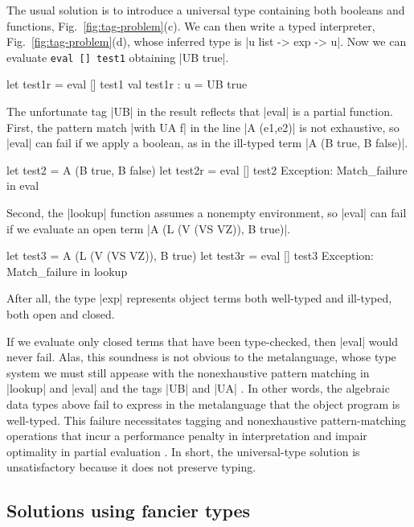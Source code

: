 The usual solution is to introduce a universal type \citep[\S1.3]
{WalidICFP02} containing both booleans and functions\ifshort,
Fig.~\ref{fig:tag-problem}(c)\fi.
\ifshort\else{}\fi
We can then write a typed interpreter\ifshort,
Fig.~\ref{fig:tag-problem}(d), \else{}\fi
whose inferred type is |u list -> exp -> u|. Now we can evaluate
\ifshort
\texttt{eval [] test1} obtaining |UB true|.
\else
\begin{code}
let test1r = eval [] test1
val test1r : u = UB true 
\end{code}
\fi
The unfortunate tag |UB| in the result reflects that |eval| is a partial
function.  
First, the pattern match |with UA f| in the line
|A (e1,e2)| is not exhaustive, so |eval| can fail if we apply a boolean,
as in the ill-typed term |A (B true, B false)|.
\ifshort\else
\begin{code}
let test2 = A (B true, B false)
let test2r = eval [] test2
Exception: Match_failure in eval
\end{code}
\fi
Second, the |lookup|
function assumes a nonempty environment, so |eval| can fail if we
evaluate an open term
\ifshort
|A (L (V (VS VZ)), B true)|.
\else
\begin{code}
let test3 = A (L (V (VS VZ)), B true)
let test3r = eval [] test3
Exception: Match_failure in lookup
\end{code}
\fi
After all, the type |exp| represents object
terms both well-typed and ill-typed, both open and closed.

If we evaluate only closed terms that have been type-checked, then
|eval| would never fail. Alas, this soundness is not obvious to the
metalanguage, whose type system we must still appease with the
nonexhaustive pattern matching in |lookup| and |eval| and the tags |UB|
and |UA| \cite[\S1.4]{WalidICFP02}.  In other words, the algebraic data
types above fail to express in the metalanguage that the object program
is well-typed.  This failure necessitates tagging and nonexhaustive
pattern\hyp matching operations that incur a performance penalty in
interpretation \cite{WalidICFP02} and impair optimality in partial evaluation
\cite{taha-tag}.  In short, the universal\hyp type solution is
unsatisfactory because it does not preserve typing.

\ifshort\else\subsection{Solutions using fancier types}\fi

